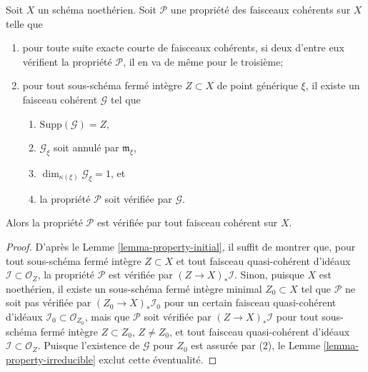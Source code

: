\begin{lemma}
\label{lemma-property}
Soit $X$ un schéma noethérien.
Soit $\mathcal{P}$ une propriété des faisceaux cohérents sur $X$ telle que
\begin{enumerate}
\item pour toute suite exacte courte de faisceaux cohérents, si deux
d'entre eux vérifient la propriété $\mathcal{P}$, il en va de même pour le
troisième;
\item pour tout sous-schéma fermé intègre $Z \subset X$
de point générique $\xi$, il existe
un faisceau cohérent $\mathcal{G}$ tel que
\begin{enumerate}
\item $\text{Supp}(\mathcal{G}) = Z$,
\item $\mathcal{G}_\xi$ soit annulé par $\mathfrak m_\xi$,
\item $\dim_{\kappa(\xi)} \mathcal{G}_\xi = 1$, et
\item la propriété $\mathcal{P}$ soit vérifiée par $\mathcal{G}$.
\end{enumerate}
\end{enumerate}
Alors la propriété $\mathcal{P}$ est vérifiée par tout faisceau cohérent
sur $X$.
\end{lemma}

\begin{proof}
D'après le Lemme \ref{lemma-property-initial}, il suffit de montrer que,
pour tout sous-schéma fermé intègre $Z \subset X$ et tout faisceau quasi-cohérent
d'idéaux $\mathcal{I} \subset \mathcal{O}_Z$, la propriété $\mathcal{P}$ est vérifiée
par $(Z \to X)_*\mathcal{I}$. Sinon, puisque $X$ est noethérien,
il existe un sous-schéma fermé intègre minimal $Z_0 \subset X$ tel que
$\mathcal{P}$ ne soit pas vérifiée par $(Z_0 \to X)_*\mathcal{I}_0$ pour un certain
faisceau quasi-cohérent d'idéaux $\mathcal{I}_0 \subset \mathcal{O}_{Z_0}$,
mais que $\mathcal{P}$ soit vérifiée par $(Z \to X)_*\mathcal{I}$ pour tout sous-schéma
fermé intègre $Z \subset Z_0$, $Z \not = Z_0$, et tout faisceau quasi-cohérent
d'idéaux $\mathcal{I} \subset \mathcal{O}_Z$. Puisque l'existence de
$\mathcal{G}$ pour $Z_0$ est assurée par (2), le
Lemme \ref{lemma-property-irreducible} exclut cette éventualité.
\end{proof}

